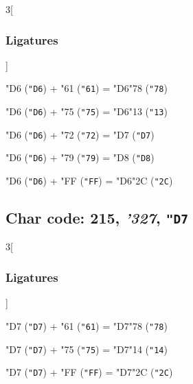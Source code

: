 \documentclass{article}
\newlength{\maxcharwidth}
\begin{document}
\begin{multicols}{3}[\subsubsection{Ligatures}]

{\testfont\char"D6\noboundary} ({\tt"D6}) + {\testfont\char"61\noboundary} ({\tt"61}) = {\testfont\char"D6\noboundary}{\testfont\char"78\noboundary} ({\tt"78}) 

{\testfont\char"D6\noboundary} ({\tt"D6}) + {\testfont\char"75\noboundary} ({\tt"75}) = {\testfont\char"D6\noboundary}{\testfont\char"13\noboundary} ({\tt"13}) 

{\testfont\char"D6\noboundary} ({\tt"D6}) + {\testfont\char"72\noboundary} ({\tt"72}) = {\testfont\char"D7\noboundary} ({\tt"D7}) 

{\testfont\char"D6\noboundary} ({\tt"D6}) + {\testfont\char"79\noboundary} ({\tt"79}) = {\testfont\char"D8\noboundary} ({\tt"D8}) 

{\testfont\char"D6\noboundary} ({\tt"D6}) + {\testfont\char"FF\noboundary} ({\tt"FF}) = {\testfont\char"D6\noboundary}{\testfont\char"2C\noboundary} ({\tt"2C}) 

\end{multicols}

\subsection{Char code: 215, {\it'327}, {\tt"D7}}
\label{char_215}


\begin{multicols}{3}[\subsubsection{Ligatures}]

{\testfont\char"D7\noboundary} ({\tt"D7}) + {\testfont\char"61\noboundary} ({\tt"61}) = {\testfont\char"D7\noboundary}{\testfont\char"78\noboundary} ({\tt"78}) 

{\testfont\char"D7\noboundary} ({\tt"D7}) + {\testfont\char"75\noboundary} ({\tt"75}) = {\testfont\char"D7\noboundary}{\testfont\char"14\noboundary} ({\tt"14}) 

{\testfont\char"D7\noboundary} ({\tt"D7}) + {\testfont\char"FF\noboundary} ({\tt"FF}) = {\testfont\char"D7\noboundary}{\testfont\char"2C\noboundary} ({\tt"2C}) 

\end{multicols}
\end{document}
